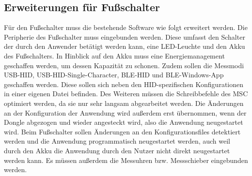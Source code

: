 \subsection{Erweiterungen für Fußschalter}
Für den Fußschalter muss die bestehende Software wie folgt erweitert werden. Die Peripherie des Fußschalter muss eingebunden werden. Diese umfasst den Schalter der durch den Anwender betätigt werden kann, eine LED-Leuchte und den Akku des Fußschalters. In Hinblick auf den Akku muss eine Energiemanagement geschaffen werden, um dessen Kapazität zu schonen. Zudem sollen die Messmodi USB-HID, USB-HID-Single-Character, BLE-HID und BLE-Windows-App geschaffen werden. Diese sollen sich neben den HID-spezifischen Konfigurationen in einer eigenen Datei befinden. Des Weiteren müssen die Schreibbefehle des MSC optimiert werden, da sie nur sehr langsam abgearbeitet werden. Die Änderungen an der Konfiguration der Anwendung wird außerdem erst übernommen, wenn der Dongle abgezogen und wieder angesteckt wird, also die Anwendung neugestartet wird. Beim Fußschalter sollen Änderungen an den Konfigurationsfiles detektiert werden und die Anwendung programmatisch neugestartet werden, auch weil durch den Akku die Anwendung durch den Nutzer nicht direkt neugestartet werden kann. Es müssen außerdem die Messuhren bzw. Messschieber eingebunden werden.